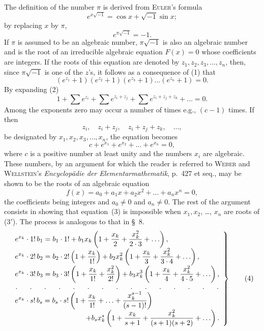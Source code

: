 \documentclass[a4paper,12pt]{book}[2004/02/16]
\providecommand{\hyperlink}[2]{#2}
\providecommand{\hypertarget}[2]{#2}
\theoremstyle{ilemma}
\theoremstyle{itheorem}
\theoremstyle{iother}
\theoremstyle{icorollary}
\theoremstyle{numcorollary}
\theoremstyle{idefinition}
\begin{document}
The definition of the number $\pi$ is derived from \textsc{Euler}'s
formula
\[
  e^{x \sqrt{-1}} = \cos x + \sqrt{-1} \sin x;
\]
by replacing $x$ by $\pi$,
\hypertarget{eq1p25}{\[
\label{p25eq1}
  e^{\pi \sqrt{-1}} =-1.\tag{1}
\]}
If $\pi$ is assumed to be an algebraic number, $\pi\sqrt{-1}$ is also
an algebraic number and is the root of an irreducible algebraic
equation $F(x)=0$ whose coefficients are integers. If the roots of
this equation are denoted by $z_1, z_2, z_3,\ldots, z_n$, then, since
$\pi \sqrt{-1}$ is one of the $z$'s, it follows as a consequence of
\hyperlink{eq1p25}{(1)} that
\hypertarget{eq2p25}{\[
  (e^{z_1}+1) (e^{z_2}+1) (e^{z_3}+1) \ldots (e^{z_n}+1) =0.\tag{2}
\]}
By expanding \hyperlink{eq2p25}{(2)}
\[
  1 + \sum e^{z_i} + \sum e^{z_i+z_j} + \sum e^{z_i+z_j+z_k} + \ldots = 0.
\]
Among the exponents zero may occur a number of times e.g., $(c-1)$
times. If then
\[
   z_i, \quad z_i + z_j, \quad z_i + z_j + z_k,\quad \ldots,
\]
be designated by $x_1, x_2, x_3, \ldots, x_n$, the equation becomes
\hypertarget{eq3p25}{\[
  c + e^{x_1} + e^{x_2} + \ldots + e^{x_n} =0,\tag{3}
\]}
where $c$ is a positive number at least unity and the numbers $x_i$
are algebraic. These numbers, by an argument for which the reader is
referred to \textsc{Weber} and \textsc{Wellstein}'s
\emph{Encyclop\"{a}die der Elementarmathematik}, p.~427 et seq., may
be shown to be the roots of an algebraic equation
\[
  f(x) = a_0 + a_1 x + a_2 x^2 + \ldots + a_n x^n = 0,\tag{$3'$}
\]
the coefficients being integers and $a_0\neq0$ and $a_n\neq0$. The
rest of the argument consists in showing that equation~\hyperlink{eq3p25}{(3)} is
impossible when $x_1,x_2$, \ldots, $x_n$ are roots of ($3'$). The
process is analogous to that in \hyperlink{chIsec8}{\S~8}.
\hypertarget{eq4p26}{\[
\left.
\begin{array}{l}\displaystyle
  e^{x_k}\cdot1!\,b_1 = b_1\cdot1! + b_1x_k \left(1 + \frac{x_k}{2}
  + \frac{x_k^2}{2\cdot3} +\ldots \right),
\\ \displaystyle
  e^{x_k}\cdot2!\,b_2 = b_2\cdot2!\left(1 + \frac{x_k}{1!} \right)
  + b_2x_k^2 \left(1 + \frac{x_k}{3} + \frac{x_k^2}{3\cdot4}
  + \ldots\right),
\\ \displaystyle
  e^{x_k}\cdot3!\,b_3 = b_3\cdot3!\left(1 + \frac{x_k}{1!}
  + \frac{x_k^2}{2!} \right) + b_3x_k^3\left(1 + \frac{x_k}{4}
  + \frac{x_k^2}{4\cdot5} + \ldots \right),
\\
\hdotsfor[10]{1}
\\ \displaystyle
  e^{x_k}\cdot s!\,b_s = b_s\cdot s!\left(1 + \frac{x_k}{1!}
  + \ldots + \frac{x_k^{s-1}}{(s-1)!} \right)
\\ \displaystyle
  \hfill + b_s x_k^s\left(1 + \frac{x_k}{s+1}
  + \frac{x_k^2}{(s+1)(s+2)} + \ldots \right).
\end{array}
\right\}
\tag{4}
\]}
\end{document}
